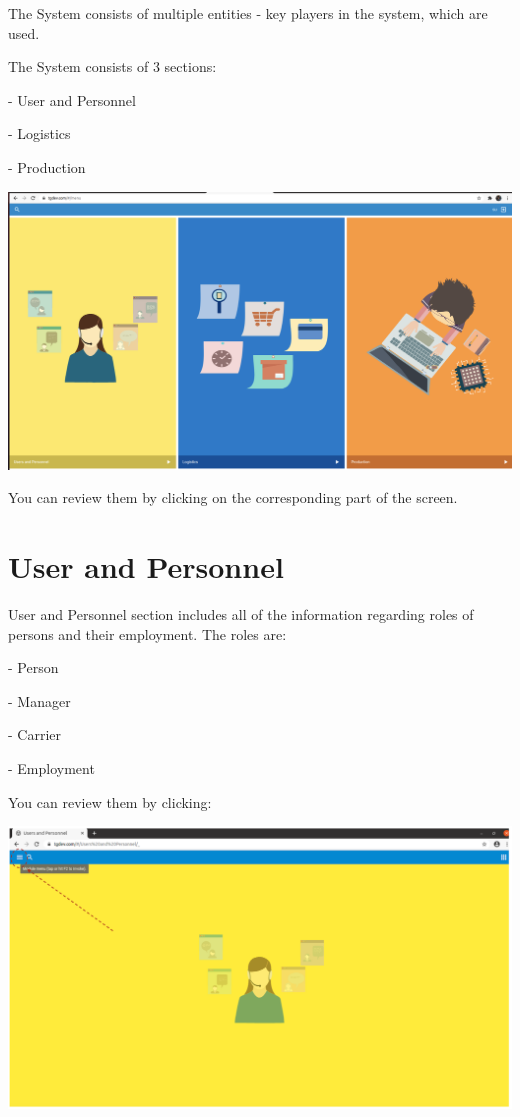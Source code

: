 The System consists of multiple entities - key players in the system, which are used.

The System consists of 3 sections:

- User and Personnel 

- Logistics

- Production

\includegraphics[width=\textwidth]{sections/01-chapter/images/main.png}


You can review them by clicking on the corresponding part of the screen.

\section{User and Personnel}

User and Personnel section includes all of the information regarding roles of persons and their employment. The roles are:

- Person 

- Manager

- Carrier

- Employment

You can review them by clicking:

\includegraphics[width=\textwidth]{sections/01-chapter/images/review1.png}




